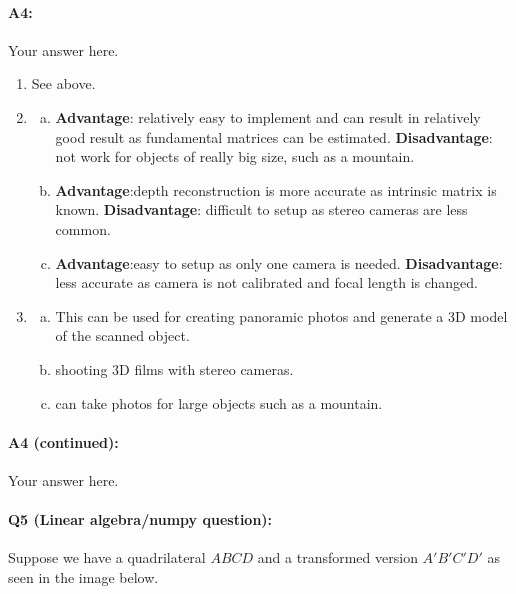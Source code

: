 \paragraph{A4:} Your answer here.

\begin{enumerate}[]

    \item See above.

    \item \begin{enumerate}[(a)]
              \item \textbf{Advantage}: relatively easy to implement and can result in relatively good result as fundamental matrices can be estimated. \textbf{Disadvantage}: not work for objects of really big size, such as a mountain.
              \item \textbf{Advantage}:depth reconstruction is more accurate as intrinsic matrix is known. \textbf{Disadvantage}: difficult to setup as stereo cameras are less common.
              \item \textbf{Advantage}:easy to setup as only one camera is needed. \textbf{Disadvantage}: less accurate as camera is not calibrated and focal length is changed.
          \end{enumerate}

    \item \begin{enumerate}[(a)]
              \item This can be used for creating panoramic photos and generate a 3D model of the scanned object.
              \item shooting 3D films with stereo cameras.
              \item can take photos for large objects such as a mountain.
          \end{enumerate}

\end{enumerate}

\pagebreak
\paragraph{A4 (continued):} Your answer here.


\pagebreak
\paragraph{Q5 (Linear algebra/numpy question):}
Suppose we have a quadrilateral $ABCD$ and a transformed version $A'B'C'D'$ as seen in the image below.

